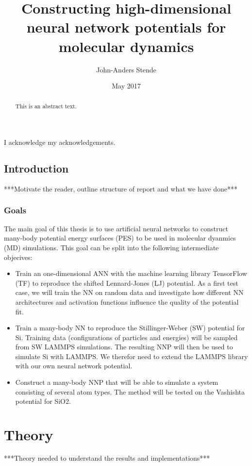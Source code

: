 \documentclass[twoside,english]{uiofysmaster}
\author{John-Anders Stende}
\title{Constructing high-dimensional neural network potentials for molecular dynamics}
\date{May 2017}
\begin{document}
\maketitle

\begin{abstract}
This is an abstract text.
\end{abstract}

\begin{acknowledgements}
  I acknowledge my acknowledgements.
\end{acknowledgements}

\tableofcontents

\chapter{Introduction}
***Motivate the reader, outline structure of report and what we have done***

\section{Goals}
The main goal of this thesis is to use artificial neural networks to
construct many-body potential energy surfaces (PES) to be used in molecular dyanmics (MD) simulations.  
This goal can be split into the following intermediate objecives:
\begin{itemize}
 \item Train an one-dimensional ANN with the machine learning library TensorFlow (TF) 
 to reproduce the shifted Lennard-Jones (LJ) potential.
 As a first test case, we will train the NN on random data and investigate
 how different NN architectures and activation functions influence the quality of the potential fit. 
 \item Train a many-body NN to reproduce the Stillinger-Weber (SW) potential for Si. 
 Training data (configurations of particles and energies) will be sampled from SW LAMMPS simulations. 
 The resulting NNP will then be used to simulate Si with LAMMPS. 
 We therefor need to extend the LAMMPS library with our own neural network potential.
 \item Construct a many-body NNP that will be able to simulate a system consisting of several atom types. 
 The method will be tested on the Vashishta potential for SiO2.
\end{itemize}


\part{Theory}
***Theory needed to understand the results and implementations***
\end{document}
